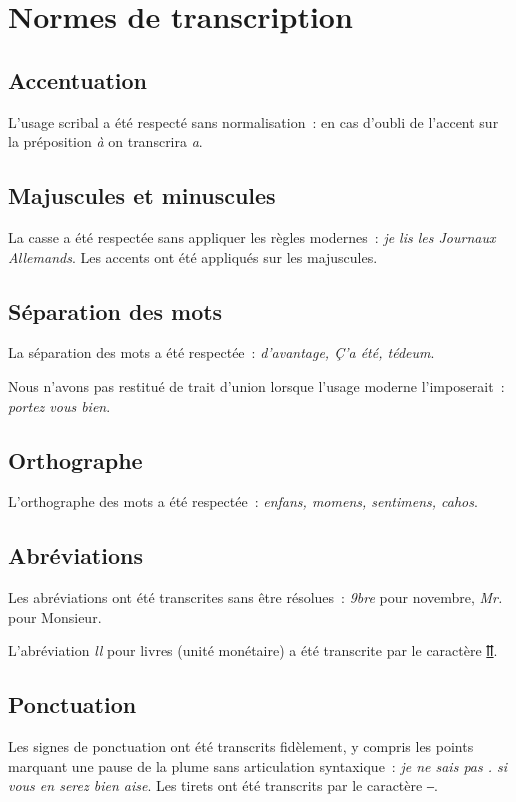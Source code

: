 \documentclass[a4paper,12pt,twoside]{book}
\begin{document}
	\appendixpage %
	\chapter{Normes de transcription}
	
		\section{Accentuation}
		L'usage scribal a été respecté sans normalisation~: en cas d'oubli de l'accent sur la préposition \textit{à} on transcrira \textit{a}.
		
		\section{Majuscules et minuscules}
		La casse a été respectée sans appliquer les règles modernes~: \textit{je lis les Journaux Allemands}. Les accents ont été appliqués sur les majuscules.
		
		\section{Séparation des mots}
		La séparation des mots a été respectée~: \textit{d'avantage, Ç'a été, tédeum}.
		
		Nous n'avons pas restitué de trait d'union lorsque l'usage moderne l'imposerait~: \textit{portez vous bien}.
				
		\section{Orthographe}
		L'orthographe des mots a été respectée~: \textit{enfans, momens, sentimens, cahos}.
		
		\section{Abréviations}
		Les abréviations ont été transcrites sans être résolues~: \textit{9bre} pour novembre, \textit{Mr.} pour Monsieur.
		
		L'abréviation \textit{ll} pour livres (unité monétaire) a été transcrite par le caractère \href{https://mufi.info/m.php?p=muficharinfo&i=4088}{ỻ}.

		\section{Ponctuation}
		Les signes de ponctuation ont été transcrits fidèlement, y compris les points marquant une pause de la plume sans articulation syntaxique~: \textit{je ne sais pas . si vous en serez bien aise}. Les tirets ont été transcrits par le caractère ‒.
		
\end{document}
